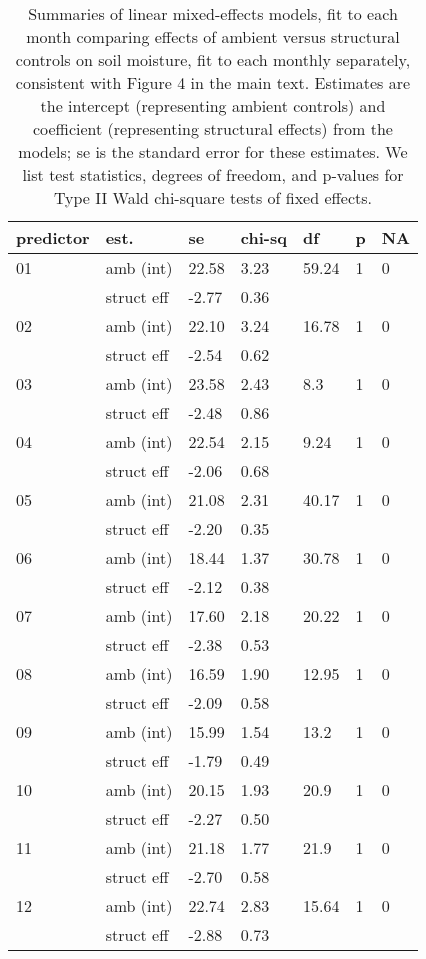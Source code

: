 \documentclass{article}
\begin{document}
\begin{table}[ht]
\centering
\caption{Summaries of linear mixed-effects models, fit to each month comparing effects of ambient versus structural controls on soil moisture, fit to each monthly separately, consistent with Figure 4 in the main text. Estimates are the intercept (representing ambient controls) and coefficient (representing structural effects) from the models; se is the standard error for these estimates. We list test statistics, degrees of freedom, and p-values for Type II Wald chi-square tests of fixed effects.} 
\label{table:shamamb_soilmoism}
\begin{tabular}{|p{}|p{}|p{}p{}p{}p{}p{}|}
  \hline
predictor & est. & se & chi-sq & df & p & NA \\ 
  \hline
01 & amb (int) & 22.58 & 3.23 & 59.24 & 1 & 0 \\ 
    & struct eff & -2.77 & 0.36 &  &  &  \\ 
  02 & amb (int) & 22.10 & 3.24 & 16.78 & 1 & 0 \\ 
    & struct eff & -2.54 & 0.62 &  &  &  \\ 
  03 & amb (int) & 23.58 & 2.43 & 8.3 & 1 & 0 \\ 
    & struct eff & -2.48 & 0.86 &  &  &  \\ 
  04 & amb (int) & 22.54 & 2.15 & 9.24 & 1 & 0 \\ 
    & struct eff & -2.06 & 0.68 &  &  &  \\ 
  05 & amb (int) & 21.08 & 2.31 & 40.17 & 1 & 0 \\ 
    & struct eff & -2.20 & 0.35 &  &  &  \\ 
  06 & amb (int) & 18.44 & 1.37 & 30.78 & 1 & 0 \\ 
    & struct eff & -2.12 & 0.38 &  &  &  \\ 
  07 & amb (int) & 17.60 & 2.18 & 20.22 & 1 & 0 \\ 
    & struct eff & -2.38 & 0.53 &  &  &  \\ 
  08 & amb (int) & 16.59 & 1.90 & 12.95 & 1 & 0 \\ 
    & struct eff & -2.09 & 0.58 &  &  &  \\ 
  09 & amb (int) & 15.99 & 1.54 & 13.2 & 1 & 0 \\ 
    & struct eff & -1.79 & 0.49 &  &  &  \\ 
  10 & amb (int) & 20.15 & 1.93 & 20.9 & 1 & 0 \\ 
    & struct eff & -2.27 & 0.50 &  &  &  \\ 
  11 & amb (int) & 21.18 & 1.77 & 21.9 & 1 & 0 \\ 
    & struct eff & -2.70 & 0.58 &  &  &  \\ 
  12 & amb (int) & 22.74 & 2.83 & 15.64 & 1 & 0 \\ 
    & struct eff & -2.88 & 0.73 &  &  &  \\ 
   \hline
\end{tabular}
\end{table}\clearpage
\end{document}
